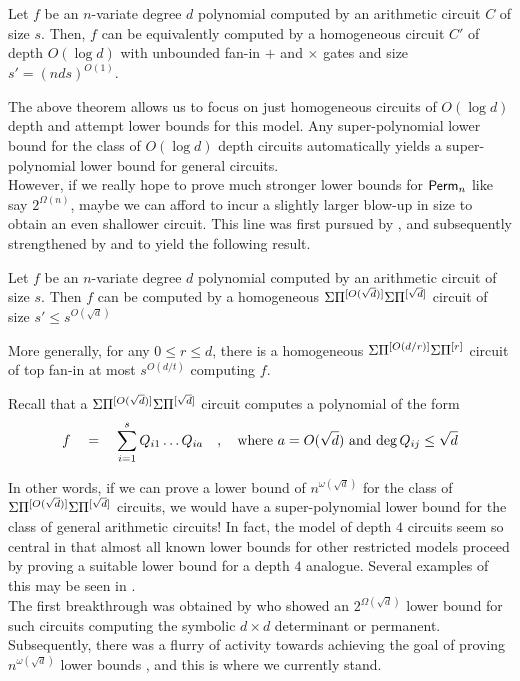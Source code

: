 \begin{theorem}
Let $f$ be an $n$-variate degree $d$ polynomial computed by an arithmetic circuit $C$ of size $s$. Then, $f$ can be equivalently computed by a homogeneous circuit $C'$ of depth $O(\log d)$ with unbounded fan-in $+$ and $\times$ gates and size $s' = (nds)^{O(1)}$. 
\end{theorem}


The above theorem allows us to focus on just homogeneous circuits of $O(\log d)$ depth and attempt lower bounds for this model. Any super-polynomial lower bound for the class of $O(\log d)$ depth circuits automatically yields a super-polynomial lower bound for general circuits. \\

However, if we really hope to prove much stronger lower bounds for $\mathsf{Perm}_n$ like say $2^{\Omega(n)}$, maybe we can afford to incur a slightly larger blow-up in size to obtain an even shallower circuit. This line was first pursued by \cite{av08}, and subsequently strengthened by \cite{koiran} and \cite{Tav13} to yield the following result. 

\begin{theorem} 
  Let $f$ be an $n$-variate degree $d$ polynomial computed by an arithmetic circuit of size $s$. Then $f$ can be computed by a homogeneous $\Sigma\Pi^{[O(\sqrt{d})]}\Sigma\Pi^{[\sqrt{d}]}$ circuit of size $s' \leq s^{O(\sqrt{d})}$

More generally, for any $0\leq r\leq d$, there is a homogeneous $\Sigma\Pi^{[O(d/r)]}\Sigma\Pi^{[r]}$ circuit of top fan-in at most $s^{O(d/t)}$ computing $f$. 
\end{theorem}

Recall that a $\Sigma\Pi^{[O(\sqrt{d})]}\Sigma\Pi^{[\sqrt{d}]}$ circuit computes a polynomial of the form
\[
f\quad = \quad \sum_{i=1}^s Q_{i1}\dots Q_{ia} \quad,\quad \text{where $a = O(\sqrt{d})$ and $\deg Q_{ij} \leq \sqrt{d}$}
\]

In other words, if we can prove a lower bound of $n^{\omega(\sqrt{d})}$ for the class of $\Sigma\Pi^{[O(\sqrt{d})]}\Sigma\Pi^{[\sqrt{d}]}$ circuits, we would have a super-polynomial lower bound for the class of general arithmetic circuits! In fact, the model of depth $4$ circuits seem so central in that almost all known lower bounds for other restricted models proceed by proving a suitable lower bound for a depth $4$ analogue. Several examples of this may be seen in \cite{KayalRP}. \\

The first breakthrough was obtained by \cite{gkks13} who showed an $2^{\Omega(\sqrt{d})}$ lower bound for such circuits computing the symbolic $d\times d$ determinant or permanent. Subsequently, there was a flurry of activity towards achieving the goal of proving $n^{\omega(\sqrt{d})}$ lower bounds \cite{KSS13,FLMS13,KS14a}, and this is where we currently stand. 

